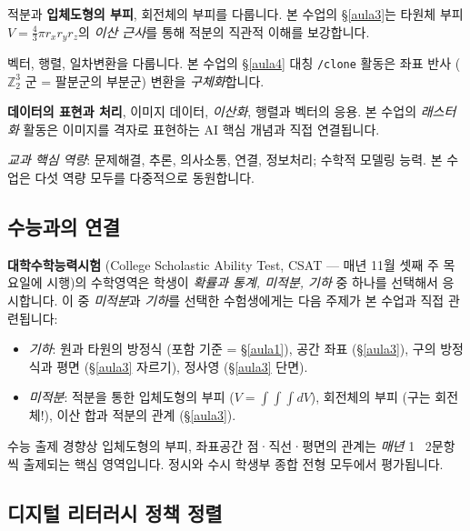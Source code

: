\documentclass[12pt,a4paper]{scrartcl}
\newcommand{\acc}[1]{\textcolor{accent}{\textbf{#1}}}
\newcommand{\cmd}[1]{\textcolor{earth}{\texttt{\small #1}}}
\begin{document}
\begin{pyojun}
적분과 \acc{입체도형의 부피}, 회전체의 부피를 다룹니다. 본 수업의 §\ref{aula3}는 타원체 부피 $V = \tfrac{4}{3}\pi r_x r_y r_z$의 \emph{이산 근사}를 통해 적분의 직관적 이해를 보강합니다.
\end{pyojun}

\begin{pyojun}[대수 --- 일반선택]
벡터, 행렬, 일차변환을 다룹니다. 본 수업의 §\ref{aula4} 대칭 \cmd{/clone} 활동은 좌표 반사 ($\mathbb{Z}_2^3$ 군 = 팔분군의 부분군) 변환을 \emph{구체화}합니다.
\end{pyojun}

\begin{pyojun}
\acc{데이터의 표현과 처리}, 이미지 데이터, \emph{이산화}, 행렬과 벡터의 응용. 본 수업의 \emph{래스터화} 활동은 이미지를 격자로 표현하는 AI 핵심 개념과 직접 연결됩니다.
\end{pyojun}

\medskip
\emph{교과 핵심 역량}: 문제해결, 추론, 의사소통, 연결, 정보처리; 수학적 모델링 능력. 본 수업은 다섯 역량 모두를 다중적으로 동원합니다.

\subsection{수능과의 연결}\label{sec:suneung}

\acc{대학수학능력시험} (College Scholastic Ability Test, CSAT --- 매년 11월 셋째 주 목요일에 시행)의 수학영역은 학생이 \emph{확률과 통계, 미적분, 기하} 중 하나를 선택해서 응시합니다. 이 중 \emph{미적분}과 \emph{기하}를 선택한 수험생에게는 다음 주제가 본 수업과 직접 관련됩니다:

\begin{itemize}[leftmargin=1.3em,itemsep=0.15em,topsep=0.3em]
  \item \emph{기하}: 원과 타원의 방정식 (포함 기준 = §\ref{aula1}), 공간 좌표 (§\ref{aula3}), 구의 방정식과 평면 (§\ref{aula3} 자르기), 정사영 (§\ref{aula3} 단면).
  \item \emph{미적분}: 적분을 통한 입체도형의 부피 ($V = \int\int\int dV$), 회전체의 부피 (구는 회전체!), 이산 합과 적분의 관계 (§\ref{aula3}).
\end{itemize}

수능 출제 경향상 입체도형의 부피, 좌표공간 점·직선·평면의 관계는 \emph{매년} 1\,~\,2문항씩 출제되는 핵심 영역입니다. 정시와 수시 학생부 종합 전형 모두에서 평가됩니다.

\subsection{디지털 리터러시 정책 정렬}
\end{document}
